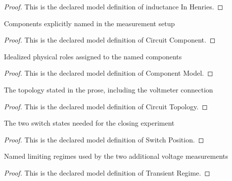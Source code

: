 \begin{proof}
  This is the declared model definition of inductance In Henries.
\end{proof}
\begin{definition}
  \label{def:physics:phyx-mini-0988:phyxminiproblems-problemphyxmini0988-circuitcomponent}
  Components explicitly named in the measurement setup
\end{definition}
\begin{proof}
  This is the declared model definition of Circuit Component.
\end{proof}
\begin{definition}
  \label{def:physics:phyx-mini-0988:phyxminiproblems-problemphyxmini0988-componentmodel}
  Idealized physical roles assigned to the named components
\end{definition}
\begin{proof}
  This is the declared model definition of Component Model.
\end{proof}
\begin{definition}
  \label{def:physics:phyx-mini-0988:phyxminiproblems-problemphyxmini0988-circuittopology}
  The topology stated in the prose, including the voltmeter connection
\end{definition}
\begin{proof}
  This is the declared model definition of Circuit Topology.
\end{proof}
\begin{definition}
  \label{def:physics:phyx-mini-0988:phyxminiproblems-problemphyxmini0988-switchposition}
  The two switch states needed for the closing experiment
\end{definition}
\begin{proof}
  This is the declared model definition of Switch Position.
\end{proof}
\begin{definition}
  \label{def:physics:phyx-mini-0988:phyxminiproblems-problemphyxmini0988-transientregime}
  Named limiting regimes used by the two additional voltage measurements
\end{definition}
\begin{proof}
  This is the declared model definition of Transient Regime.
\end{proof}
